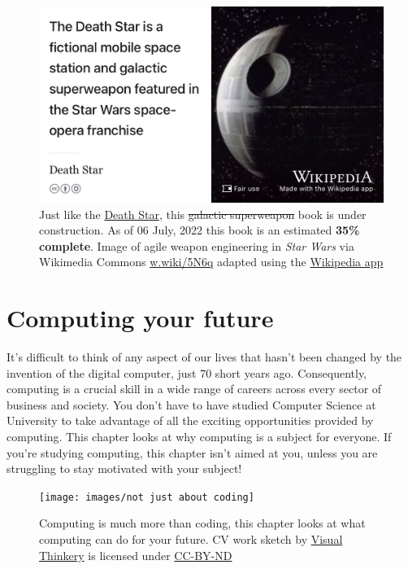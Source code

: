 \documentclass[
]{book}
\begin{document}
\begin{figure}

{\centering \includegraphics[width=0.99\linewidth]{images/DeathStar2} 

}

\caption{Just like the \href{https://en.wikipedia.org/wiki/Death_Star}{Death Star}, this \sout{galactic superweapon} book is under construction. As of 06 July, 2022 this book is an estimated \textbf{35\% complete}. Image of agile weapon engineering in \emph{Star Wars} via Wikimedia Commons \href{https://w.wiki/5N6q}{w.wiki/5N6q} adapted using the \href{https://apps.apple.com/gb/app/wikipedia/id324715238}{Wikipedia app}}\label{fig:deathstar2-fig}
\end{figure}

\hypertarget{computing}{%
\chapter{Computing your future}\label{computing}}

It's difficult to think of any aspect of our lives that hasn't been changed by the invention of the digital computer, just 70 short years ago. Consequently, computing is a crucial skill in a wide range of careers across every sector of business and society. You don't have to have studied Computer Science at University to take advantage of all the exciting opportunities provided by computing. This chapter looks at why computing is a subject for everyone. If you're studying computing, this chapter isn't aimed at you, unless you are struggling to stay motivated with your subject! 👨🏿‍💻👨‍💻👩🏽‍💻👩‍💻👨🏿‍💻

\begin{figure}

{\centering \texttt{[image: images/not just about coding]} 

}

\caption{Computing is much more than coding, this chapter looks at what computing can do for your future. CV work sketch by \href{https://visualthinkery.com}{Visual Thinkery} is licensed under \href{https://creativecommons.org/licenses/by-nd/4.0/}{CC-BY-ND}}\label{fig:not-coding-fig}
\end{figure}
\end{document}
